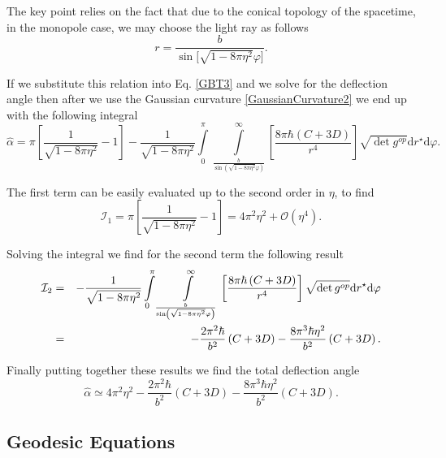 \documentclass[preprint,superscriptaddress,amsfonts,amssymb,amsmath,showpacs]{revtex4}
\begin{document}
The key point relies on the fact that due to the conical topology of the spacetime, in the monopole case, we may choose the light ray as follows
\begin{equation}
r=\frac{b}{\sin\Big[\sqrt{1-8 \pi \eta^2 } \varphi\big]}.
\end{equation} 
 
If we substitute this relation into Eq. \eqref{GBT3} and we solve for the deflection angle then after we use the Gaussian curvature \eqref{GaussianCurvature2} we end up with the following integral
\begin{equation}
\hat{\alpha}=\pi \left[ \frac{1}{\sqrt{1-8 \pi \eta^2}}-1 \right]-\frac{1}{\sqrt{1-8\pi \eta^2}}\int\limits_{0}^{\pi}\int\limits_{\frac{b}{\sin\left(\sqrt{1-8 \pi \eta^2 } \varphi\right)}}^{\infty}\left[\frac{8 \pi \hbar \left(C+3D \right)}{r^4} \right]\sqrt{\det g^{op}}\mathrm{d}r^{\star}\mathrm{d}\varphi.
\end{equation}

The first term can be easily evaluated up to the second order in $\eta$, to find
\begin{equation}
\mathcal{I}_1=\pi \left[ \frac{1}{\sqrt{1-8 \pi \eta^2}}-1 \right]=4\pi^2 \eta^2+\mathcal{O}(\eta^4).
\end{equation}

Solving the integral we find for the second term the following result
\begin{eqnarray}\notag
\mathcal{I}_2 &=& -\frac{1}{\sqrt{1-8\pi \eta^2}}\int\limits_{0}^{\pi}\int\limits_{\frac{b}{\sin\left(\sqrt{1-8 \pi \eta^2 } \varphi\right)}}^{\infty}\left[\frac{8 \pi \hbar \left(C+3D \right)}{r^4} \right]\sqrt{\det g^{op}}\mathrm{d}r^{\star}\mathrm{d}\varphi \\
&=& -\frac{2 \pi^2 \hbar }{b^2}\left( C+3D \right)-\frac{8 \pi^3 \hbar \eta^2 }{b^2}\left(C+3D\right).
\end{eqnarray}

Finally putting together these results we find the total deflection angle
\begin{equation}\label{a2}
\hat{\alpha}\simeq 4 \pi^2 \eta^2-\frac{2 \pi^2 \hbar }{b^2}\left( C+3D \right)-\frac{8 \pi^3 \hbar \eta^2 }{b^2}\left(C+3D\right).
\end{equation}



\subsection{Geodesic Equations}
\end{document}
